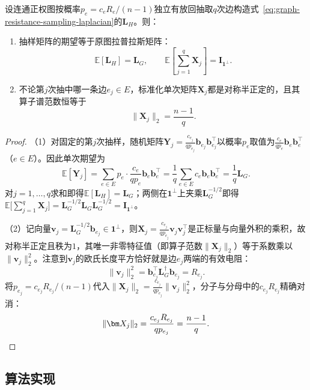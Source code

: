 \begin{lemma}[有效电阻抽样的无偏性与单次范数界]
\label{lem:graph-resistance-sampling-moments}
设连通正权图按概率$p_e=c_eR_e/(n-1)$独立有放回抽取$q$次边构造式~\eqref{eq:graph-resistance-sampling-laplacian}的$\bm L_H$。则：
\begin{enumerate}
  \item 抽样矩阵的期望等于原图拉普拉斯矩阵：
  \begin{equation}
  \mathbb E[\bm L_H]=\bm L_G,\qquad
  \mathbb E\!\left[\sum_{j=1}^q\bm X_j\right]=\bm I_{\bm 1^\perp}.
  \label{eq:graph-resistance-sampling-expectation}
  \end{equation}
  \item 不论第$j$次抽中哪一条边$e_j\in E$，标准化单次矩阵$\bm X_j$都是对称半正定的，且其算子谱范数恒等于
  \[
    \lVert\bm X_j\rVert_2=\frac{n-1}{q}.
  \]
\end{enumerate}
\end{lemma}

\begin{proof}
（1）对固定的第$j$次抽样，随机矩阵$\bm Y_j=\frac{c_{e_j}}{qp_{e_j}}\bm b_{e_j}\bm b_{e_j}^\top$以概率$p_e$取值为$\frac{c_e}{qp_e}\bm b_e\bm b_e^\top$（$e\in E$）。因此单次期望为
\[
  \mathbb E[\bm Y_j]
  =\sum_{e\in E}p_e\cdot\frac{c_e}{qp_e}\bm b_e\bm b_e^\top
  =\frac{1}{q}\sum_{e\in E}c_e\bm b_e\bm b_e^\top
  =\frac{1}{q}\bm L_G.
\]
对$j=1,\ldots,q$求和即得$\mathbb E[\bm L_H]=\bm L_G$；两侧在$\bm 1^\perp$上夹乘$\bm L_G^{-1/2}$即得$\mathbb E\bigl[\sum_{j=1}^q\bm X_j\bigr]=\bm L_G^{-1/2}\bm L_G\bm L_G^{-1/2}=\bm I_{\bm 1^\perp}$。

（2）记向量$\bm v_j=\bm L_G^{-1/2}\bm b_{e_j}\in\bm 1^\perp$，则$\bm X_j=\frac{c_{e_j}}{qp_{e_j}}\bm v_j\bm v_j^\top$是正标量与向量外积的乘积，故对称半正定且秩为$1$，其唯一非零特征值（即算子范数$\lVert\bm X_j\rVert_2$）等于系数乘以$\lVert\bm v_j\rVert_2^2$。注意到$\bm v_j$的欧氏长度平方恰好就是边$e_j$两端的有效电阻：
\[
\lVert\bm v_j\rVert_2^2
=\bm b_{e_j}^\top\bm L_G^\dagger\bm b_{e_j}
=R_{e_j}.
\]
将$p_{e_j}=c_{e_j}R_{e_j}/(n-1)$代入$\lVert\bm X_j\rVert_2=\frac{c_{e_j}}{qp_{e_j}}\lVert\bm v_j\rVert_2^2$，分子与分母中的$c_{e_j}R_{e_j}$精确对消：
\[
\lVert\bm X_j\rVert_2
=\frac{c_{e_j}R_{e_j}}{qp_{e_j}}
=\frac{n-1}{q}.\qedhere
\]
\end{proof}

\subsection{算法实现}
\label{sec:graph-resistance-sampling-algorithm}

